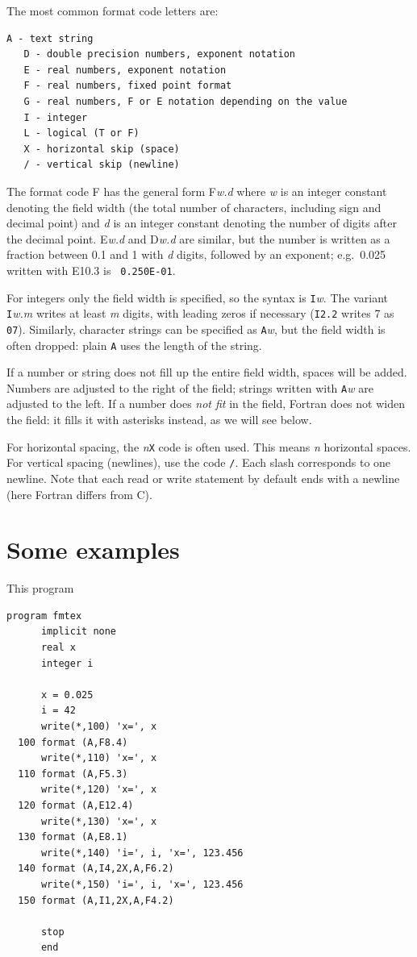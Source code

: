 The most common format code letters are:

\begin{lstlisting}[style=fortran77]
   A - text string
   D - double precision numbers, exponent notation
   E - real numbers, exponent notation
   F - real numbers, fixed point format
   G - real numbers, F or E notation depending on the value
   I - integer
   L - logical (T or F)
   X - horizontal skip (space)
   / - vertical skip (newline)
\end{lstlisting}

The format code F has the general form F\emph{w.d} where \emph{w} is an integer constant denoting the field width (the total number of characters, including sign and decimal point) and \emph{d} is an integer constant denoting the number of digits after the decimal point. E\emph{w.d} and D\emph{w.d} are similar, but the number is written as a fraction between 0.1 and 1 with \emph{d} digits, followed by an exponent; e.g.\ 0.025 written with E10.3 is \texttt{\ 0.250E-01}.

For integers only the field width is specified, so the syntax is \texttt{I}\emph{w}. The variant \texttt{I}\emph{w.m} writes at least \emph{m} digits, with leading zeros if necessary (\texttt{I2.2} writes 7 as \texttt{07}). Similarly, character strings can be specified as \texttt{A}\emph{w}, but the field width is often dropped: plain \texttt{A} uses the length of the string.

If a number or string does not fill up the entire field width, spaces will be added. Numbers are adjusted to the right of the field; strings written with \texttt{A}\emph{w} are adjusted to the left. If a number does \emph{not fit} in the field, Fortran does not widen the field: it fills it with asterisks instead, as we will see below.

For horizontal spacing, the \emph{n}\texttt{X} code is often used. This means \emph{n} horizontal spaces. For vertical spacing (newlines), use the code \texttt{/}. Each slash corresponds to one newline. Note that each read or write statement by default ends with a newline (here Fortran differs from C).

\section{Some examples}

This program

\begin{lstlisting}[style=fortran77]
      program fmtex
      implicit none
      real x
      integer i

      x = 0.025
      i = 42
      write(*,100) 'x=', x
  100 format (A,F8.4)
      write(*,110) 'x=', x
  110 format (A,F5.3)
      write(*,120) 'x=', x
  120 format (A,E12.4)
      write(*,130) 'x=', x
  130 format (A,E8.1)
      write(*,140) 'i=', i, 'x=', 123.456
  140 format (A,I4,2X,A,F6.2)
      write(*,150) 'i=', i, 'x=', 123.456
  150 format (A,I1,2X,A,F4.2)

      stop
      end
\end{lstlisting}

